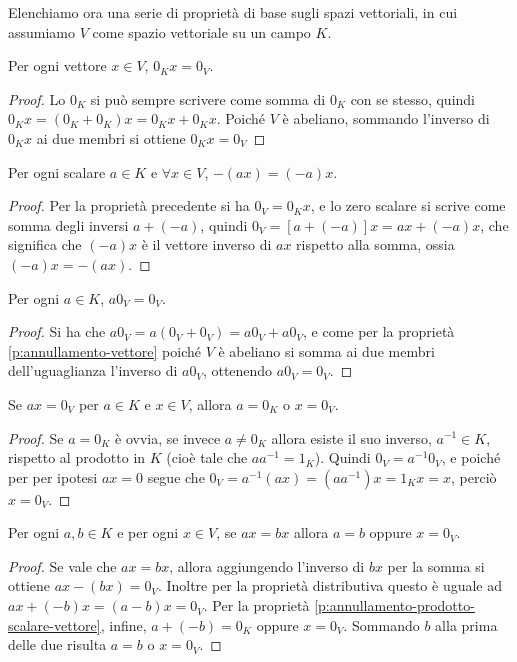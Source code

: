 Elenchiamo ora una serie di proprietà di base sugli spazi vettoriali, in cui assumiamo $V$ come spazio vettoriale su un campo $K$.
\begin{proprieta} \label{p:annullamento-vettore}
	Per ogni vettore $x\in V$, $0_K x=0_V$.
\end{proprieta}
\begin{proof}
	Lo $0_K$ si può sempre scrivere come somma di $0_K$ con se stesso, quindi $0_K x=(0_K+0_K)x=0_K x+0_K x$.
	Poiché $V$ è abeliano, sommando l'inverso di $0_K  x$ ai due membri si ottiene $0_K x=0_V$
\end{proof}
\begin{proprieta} \label{p:scalare-opposto}
	Per ogni scalare $a\in K$ e $\forall x\in V$, $-(ax)=(-a)x$.
\end{proprieta}
\begin{proof}
	Per la proprietà precedente si ha $0_V=0_K x$, e lo zero scalare si scrive come somma degli inversi $a+(-a)$, quindi $0_V=[a+(-a)]x=ax+(-a)x$, che significa che $(-a)x$ è il vettore inverso di $ax$ rispetto alla somma, ossia $(-a)x=-(ax)$.
\end{proof}
\begin{proprieta} \label{p:scalare-per-vettore-nullo}
	Per ogni $a\in K$, $a0_V=0_V$.
\end{proprieta}
\begin{proof}
	Si ha che $a0_V=a(0_V+0_V)=a0_V+a0_V$, e come per la proprietà \ref{p:annullamento-vettore} poiché $V$ è abeliano si somma ai due membri dell'uguaglianza l'inverso di $a0_V$, ottenendo $a0_V=0_V$.
\end{proof}
\begin{proprieta} \label{p:annullamento-prodotto-scalare-vettore}
	Se $ax=0_V$ per $a\in K$ e $x\in V$, allora $a=0_K$ o $x=0_V$.
\end{proprieta}
\begin{proof}
	Se $a=0_K$ è ovvia, se invece $a\neq 0_K$ allora esiste il suo inverso, $a^{-1}\in K$, rispetto al prodotto in $K$ (cioè tale che $aa^{-1}=1_K$).
	Quindi $0_V=a^{-1}0_V$, e poiché per per ipotesi $ax=0$ segue che $0_V=a^{-1}(ax)=(aa^{-1})x=1_K x=x$, perciò $x=0_V$.
\end{proof}
\begin{proprieta} \label{p:cancellazione-vettore}
	Per ogni $a,b\in K$ e per ogni $x\in V$, se $ax=bx$ allora $a=b$ oppure $x=0_V$.
\end{proprieta}
\begin{proof}
	Se vale che $ax=bx$, allora aggiungendo l'inverso di $bx$ per la somma si ottiene $ax-(bx)=0_V$.
	Inoltre per la proprietà distributiva questo è uguale ad $ax+(-b)x=(a-b)x=0_V$.
	Per la proprietà \ref{p:annullamento-prodotto-scalare-vettore}, infine, $a+(-b)=0_K$ oppure $x=0_V$.
	Sommando $b$ alla prima delle due risulta $a=b$ o $x=0_V$.
\end{proof}
